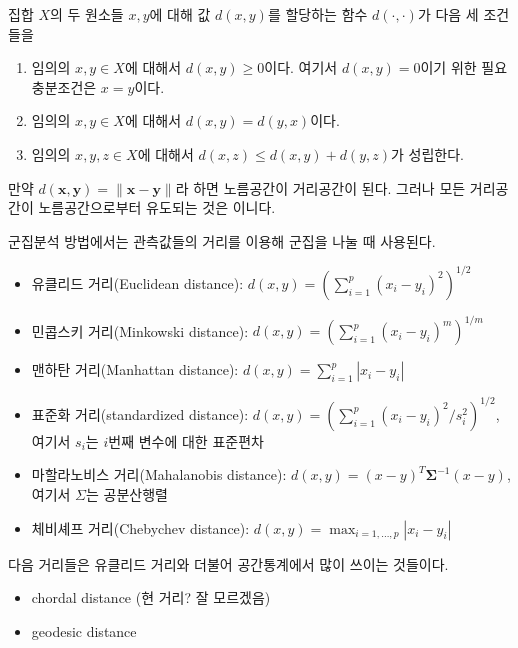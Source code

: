 \documentclass[b5paper,]{scrbook}
\theoremstyle{plain}
\theoremstyle{definition}
\numberwithin{equation}{section}
\let\BeginKnitrBlock\begin \let\EndKnitrBlock\end
\begin{document}
\BeginKnitrBlock{definition}[거리]
\protect\hypertarget{def:unnamed-chunk-34}{}{\label{def:unnamed-chunk-34} {} }집합 \(X\)의 두 원소들 \(x,y\)에 대해 값 \(d(x,y)\)를 할당하는 함수 \(d(\cdot, \cdot)\)가 다음 세 조건들을

\begin{enumerate}
\def\labelenumi{\arabic{enumi}.}
\item
  임의의 \(x,y\in X\)에 대해서 \(d(x,y)\geq 0\)이다. 여기서 \(d(x,y)=0\)이기 위한 필요충분조건은 \(x=y\)이다.
\item
  임의의 \(x,y\in X\)에 대해서 \(d(x,y)=d(y,x)\)이다.
\item
  임의의 \(x,y,z\in X\)에 대해서 \(d(x,z)\leq d(x,y)+d(y,z)\)가 성립한다.
\end{enumerate}
\EndKnitrBlock{definition}

만약 \(d(\mathbf{x},\mathbf{y})=\| \mathbf{x}-\mathbf{y}\|\)라 하면 노름공간이 거리공간이 된다. 그러나 모든 거리공간이 노름공간으로부터 유도되는 것은 이니다.

군집분석 방법에서는 관측값들의 거리를 이용해 군집을 나눌 때 사용된다.

\begin{itemize}
\item
  유클리드 거리(Euclidean distance): \(d(x,y)=(\sum_{i=1}^{p}(x_{i}-y_{i})^{2})^{1/2}\)
\item
  민콥스키 거리(Minkowski distance): \(d(x,y)=(\sum_{i=1}^{p}(x_{i}-y_{i})^{m})^{1/m}\)
\item
  맨하탄 거리(Manhattan distance): \(d(x,y)=\sum_{i=1}^{p}|x_{i}-y_{i}|\)
\item
  표준화 거리(standardized distance): \(d(x,y)=(\sum_{i=1}^{p}(x_{i}-y_{i})^{2}/s_{i}^{2})^{1/2}\), 여기서 \(s_{i}\)는 \(i\)번째 변수에 대한 표준편차
\item
  마할라노비스 거리(Mahalanobis distance): \(d(x,y)=(x-y)^{T}\boldsymbol{\Sigma}^{-1}(x-y)\), 여기서 \(\Sigma\)는 공분산행렬
\item
  체비셰프 거리(Chebychev distance): \(d(x,y)=\max_{i=1,\ldots ,p}|x_{i}-y_{i}|\)
\end{itemize}

다음 거리들은 유클리드 거리와 더불어 공간통계에서 많이 쓰이는 것들이다.

\begin{itemize}
\item
  chordal distance (현 거리? 잘 모르겠음)
\item
  geodesic distance
\end{itemize}
\end{document}
